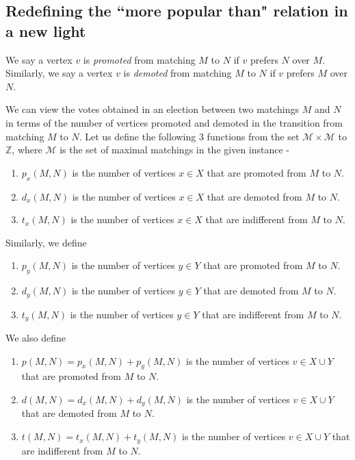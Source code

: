 \documentclass[a4paper,10pt]{article}
\theoremstyle{plain} %
\theoremstyle{plain} %
\begin{document}
\subsection{Redefining the ``more popular than" relation in a new light}
We say a vertex $v$ is \textit{promoted} from matching $M$ to $N$ if $v$ prefers $N$ over $M$. Similarly, we say a vertex $v$ is \textit{demoted} from matching $M$ to $N$ if $v$ prefers $M$ over $N$.

We can view the votes obtained in an election between two matchings $M$ and $N$ in terms of the number of vertices promoted and demoted in the transition from matching $M$ to $N$. Let us define the following 3 functions from the set $\mathcal{M} \times \mathcal{M}$ to $\mathbb{Z}$, where $\mathcal{M}$ is the set of maximal matchings in the given instance - 
\begin{enumerate}
    \item $p_x(M, N)$ is the number of vertices $x \in X$ that are promoted from $M$ to $N$.
    \item $d_x(M, N)$ is the number of vertices $x \in X$ that are demoted from $M$ to $N$.
    \item $t_x(M, N)$ is the number of vertices $x \in X$ that are indifferent from $M$ to $N$.
\end{enumerate}

Similarly, we define 
\begin{enumerate}
    \item $p_y(M, N)$ is the number of vertices $y \in Y$ that are promoted from $M$ to $N$.
    \item $d_y(M, N)$ is the number of vertices $y \in Y$ that are demoted from $M$ to $N$.
    \item $t_y(M, N)$ is the number of vertices $y \in Y$ that are indifferent from $M$ to $N$.
\end{enumerate}

We also define 
\begin{enumerate}
    \item $p(M, N) = p_x(M, N) + p_y(M, N)$ is the number of vertices $v \in X \cup Y$ that are promoted from $M$ to $N$.
    \item $d(M, N) = d_x(M, N) + d_y(M, N)$ is the number of vertices $v \in X \cup Y$ that are demoted from $M$ to $N$.
    \item $t(M, N) = t_x(M, N) + t_y(M, N)$ is the number of vertices $v \in X \cup Y$ that are indifferent from $M$ to $N$.
\end{enumerate}
\end{document}
